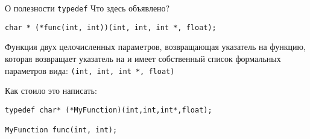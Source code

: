 \documentclass[aspectration=1610,t]{beamer}
\begin{document}
\begin{frame}[fragile]{О полезности \texttt{typedef}}
Что здесь объявлено?
    \begin{lstlisting}
char * (*func(int, int))(int, int, int *, float);
    \end{lstlisting}
\pause

Функция двух целочисленных параметров, возвращающая указатель на функцию,
которая возвращает указатель на  и имеет собственный список
формальных параметров вида: \lstinline{(int, int, int *, float)}

\medskip\pause

Как стоило это написать:
    \begin{lstlisting}
typedef char* (*MyFunction)(int,int,int*,float);

MyFunction func(int, int);
    \end{lstlisting}
\end{frame}
\end{document}
